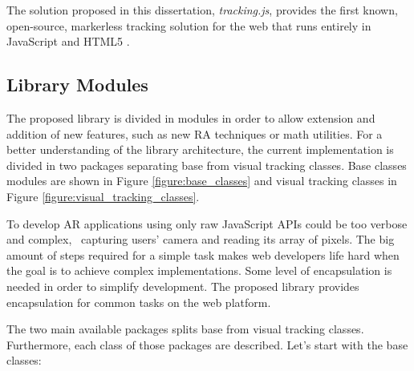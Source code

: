 The solution proposed in this dissertation, \textit{tracking.js}, provides the first known, open-source, markerless tracking solution for the web that runs entirely in JavaScript \cite{International2009} and HTML5 \cite{Hickson2013}.


\subsection{Library Modules} %
\label{sub:tracking_library_for_the_web:library_modules}

The proposed library is divided in modules in order to allow extension and addition of new features, such as new RA techniques or math utilities. For a better understanding of the library architecture, the current implementation is divided in two packages separating base from visual tracking classes. Base classes modules are shown in Figure \ref{figure:base_classes} and visual tracking classes in Figure \ref{figure:visual_tracking_classes}.

To develop AR applications using only raw JavaScript \cite{International2009} APIs \cite{MDN2013} could be too verbose and complex, \eg\ capturing users' camera and reading its array of pixels. The big amount of steps required for a simple task makes web developers life hard when the goal is to achieve complex implementations. Some level of encapsulation is needed in order to simplify development. The proposed library provides encapsulation for common tasks on the web platform.

The two main available packages splits base from visual tracking classes. Furthermore, each class of those packages are described. Let's start with the base classes:

